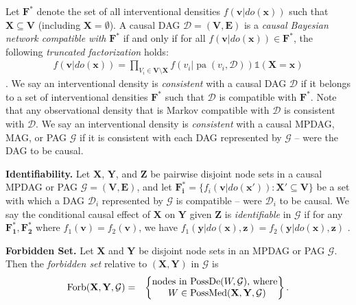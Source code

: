 \documentclass[twoside]{article}
\DeclareMathOperator{\pa}{pa}
\DeclareMathOperator{\PossDe}{PossDe}
\DeclareMathOperator{\PossMediators}{PossMed}
\newcommand{\mb}[1]{\mathbf{#1}}
\newcommand{\g}[1][G]{\mathcal{#1}}
\begin{document}
Let $\mb{F^*}$ denote the set of all interventional densities $f(\mb{v}|do(\mb{x}))$ such that $\mb{X} \subseteq \mb{V}$ (including $\mb{X} = \emptyset$). A causal DAG $\g[D] = (\mb{V,E})$ is a \textit{causal Bayesian network compatible with} $\mb{F^*}$ if and only if for all $f(\mb{v} | do(\mb{x})) \in \mb{F^*}$, the following \textit{truncated factorization} holds:
\begin{align}
    f(\mb{v} | do(\mb{x})) = \prod_{V_i \in \mb{V} \setminus \mb{X}} f(v_i|\pa(v_i,\g[D])) \mathds{1}(\mb{X} = \mb{x}) \label{eq:trunc-fact}
\end{align}
\citep{pearl2009causality, bareinboim2012local}. We say an interventional density is \textit{consistent} with a causal DAG $\g[D]$ if it belongs to a set of interventional densities $\mb{F^*}$ such that $\g[D]$ is compatible with $\mb{F^*}$. Note that any observational density that is Markov compatible with $\g[D]$ is consistent with $\g[D]$. We say an interventional density is \textit{consistent} with a causal MPDAG, MAG, or PAG $\g$ if it is consistent with each DAG represented by $\g$ -- were the DAG to be causal. 



\textbf{Identifiability.}
Let $\mb{X}$, $\mb{Y}$, and $\mb{Z}$ be pairwise disjoint node sets in a causal MPDAG or PAG $\g = (\mb{V,E})$, and let $\mb{F^*_i} = \{ f_i(\mb{v}|do(\mb{x'})) : \mb{X'} \subseteq \mb{V} \}$ be a set with which a DAG $\g[D]_i$ represented by $\g$ is compatible -- were $\g[D]_i$ to be causal. We say the conditional causal effect of $\mb{X}$ on $\mb{Y}$ given $\mb{Z}$ is \textit{identifiable} in $\g$ if for any $\mb{F^*_1}, \mb{F^*_2}$ where $f_1(\mb{v}) = f_2(\mb{v})$, we have $f_1(\mb{y}|do(\mb{x}), \mb{z}) = f_2(\mb{y}|do(\mb{x}), \mb{z})$ \citep{pearl2009causality}.

\textbf{Forbidden Set.}
Let $\mb{X}$ and $\mb{Y}$ be disjoint node sets in an MPDAG or PAG $\g$. Then the \textit{forbidden set} relative to $(\mb{X,Y})$ in $\g$ is
\begin{align}
    \text{Fo}&\text{rb}(\mb{X},\mb{Y},\g)
    =&\left\lbrace
    \begin{array}{@{}l@{}l@{}}
        \text{nodes in}\, \PossDe(W,\g) \text{, where} \notag\\
        \,\,\,\,\,\,\,\,\,\,W \in \PossMediators(\mb{X}, \mb{Y}, \g)
    \end{array}
    \right\rbrace .
\end{align}
\end{document}

